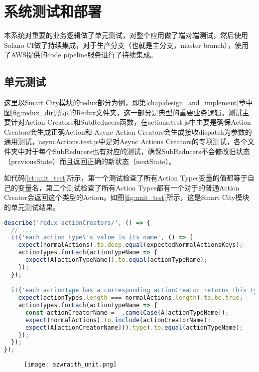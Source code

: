 
\chapter{系统测试和部署}
\label{chap:test_and_deploy}
本系统对重要的业务逻辑做了单元测试，对整个应用做了端对端测试，然后使用Solano CI做了持续集成，对于生产分支（也就是主分支，master branch），使用了AWS提供的code pipeline服务进行了持续集成。
\section{单元测试}
这里以Smart City模块的redux部分为例，即第\ref{chap:design_and_implement}章中图\ref{fig:redux_dir}所示的Redux文件夹，这一部分是典型的重要业务逻辑。测试主要针对Action Creators和SubReducers函数，在actions.test.js中主要是确保Action Creators会生成正确Action和 Async Action Creators会生成接收dispatch为参数的通用测试，asyncActions.test.js中是对Async Actions Creators的专项测试，各个文件夹中对于每个SubReducers也有对应的测试，确保SubReducers不会修改旧状态（previousState）而且返回正确的新状态（nextState）。

如代码\ref{lst:unit_test}所示，第一个测试检查了所有Action Types变量的值都等于自己的变量名，第二个测试检查了所有Action Types都有一个对于的普通Action Creator会返回这个类型的Action。如图\ref{fig:unit_test}所示，这是Smart City模块的单元测试结果。
\begin{lstlisting}[language={JavaScript}, label={lst:unit_test}, caption={单元测试样例代码}]
describe('redux actionCreators/', () => {
  // ...
  it('each action type\'s value is its name', () => {
    expect(normalActions).to.deep.equal(expectedNormalActionsKeys);
    actionTypes.forEach(actionTypeName => {
      expect(A[actionTypeName]).to.equal(actionTypeName);
    });
  });

  it('each actionType has a corresponding actionCreator returns this type of action', () => {
    expect(actionTypes.length === normalActions.length).to.be.true;
    actionTypes.forEach(actionTypeName => {
      const actionCreatorName = _.camelCase(A[actionTypeName]);
      expect(normalActions).to.include(actionCreatorName);
      expect(A[actionCreatorName]().type).to.equal(actionTypeName);
    });
  });
});
\end{lstlisting}

\begin{figure}[!htp]
 \centering
 \texttt{[image: azwraith\_unit.png]}
\end{figure}
